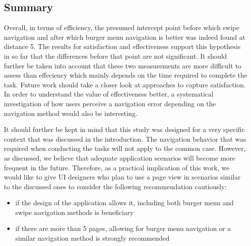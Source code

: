 \documentclass{sig-alternate-05-2015}
\begin{document}
\subsection{Summary}
Overall, in terms of efficiency, the presumed intercept point before which swipe navigation and after which burger menu navigation is better was indeed found at 
distance 5. The results for satisfaction and effectiveness support this hypothesis in so far that the differences before that point are not significant. It should further
be taken into account that these two measurements are more difficult to assess than effeciency which mainly depends on the time required to complete the task. Future work
should take a closer look at approaches to capture satisfaction. In order to understand the value of effectiveness better, a systematical investigation of how users perceive
a navigation error depending on the navigation method would also be interesting.

It should further be kept in mind that this study was designed for a very specific context that was discussed in the introduction. The navigation behavior that was required
when conducting the tasks will not apply to the common case. However, as discussed, we believe that adequate application scenarios will become more frequent in the future. 
Therefore, as a practical implication of this work, we would like to give UI designers who plan to use a page view in scenarios similar to the discussed ones
to consider the following recommendation cautiously:
\begin{itemize}
  \item if the design of the application allows it, including both burger menu and swipe navigation methods is beneficiary
  \item if there are more than 5 pages, allowing for burger menu navigation or a similar navigation method is strongly recommended
\end{itemize}
\end{document}

